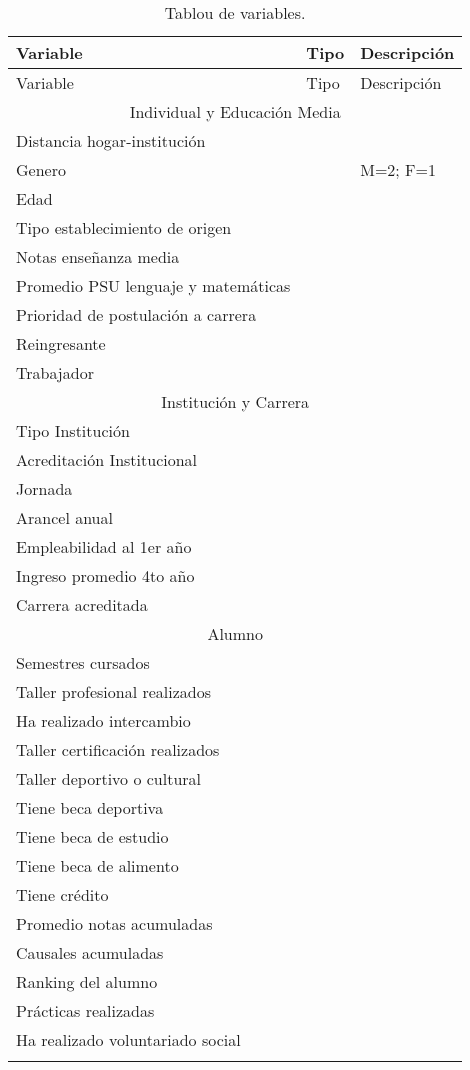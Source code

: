 \begin{longtable}{|l|l|l|}
			\hline
			Variable & Tipo & Descripción \\
			\hline \hline
			\endfirsthead
			
			\hline
            Variable & Tipo & Descripción \\
            \hline \hline
            \endhead
			
			\multicolumn{3}{c}{Individual y Educación Media} \\ \hline
			Distancia hogar-institución &  & \\ \hline
			Genero &  & M=2; F=1\\ \hline
			Edad &  & \\ \hline
			Tipo establecimiento de origen &  & \\ \hline
			Notas enseñanza media & & \\ \hline
			Promedio PSU lenguaje y matemáticas &  & \\ \hline
			Prioridad de postulación a carrera & & \\ \hline
			Reingresante & & \\ \hline
			Trabajador & & \\ \hline 
			\multicolumn{3}{c}{Institución y Carrera} \\ \hline
			Tipo Institución &  & \\ \hline
			Acreditación Institucional &  & \\ \hline
			Jornada &  & \\ \hline
			Arancel anual & & \\ \hline
			Empleabilidad al 1er año & & \\ \hline
			Ingreso promedio 4to año & & \\ \hline
			Carrera acreditada & & \\ \hline 
			\multicolumn{3}{c}{Alumno} \\ \hline
			Semestres cursados & & \\ \hline
			Taller profesional realizados & & \\ \hline
			Ha realizado intercambio & & \\ \hline
			Taller certificación realizados & & \\ \hline
			Taller deportivo o cultural & & \\ \hline
			Tiene beca deportiva & & \\ \hline
			Tiene beca de estudio &  & \\ \hline
			Tiene beca de alimento & & \\ \hline
			Tiene crédito &  & \\ \hline
			Promedio notas acumuladas &  & \\ \hline
			Causales acumuladas & & \\ \hline
			Ranking del alumno & & \\ \hline
			Prácticas realizadas & & \\ \hline
			Ha realizado voluntariado social & & \\ \hline
		\caption{Tablou de variables.}
		\label{tabla:Tablou de variables}
\end{longtable}	

